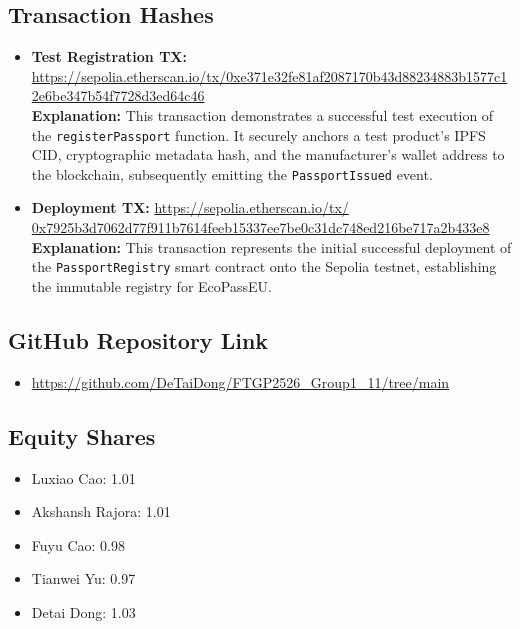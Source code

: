 \documentclass[runningheads]{llncs}
\begin{document}
	

	\subsection{Transaction Hashes}
	\begin{itemize}
		\item \textbf{Test Registration TX:} \url{https://sepolia.etherscan.io/tx/0xe371e32fe81af2087170b43d88234883b1577c12e6be347b54f7728d3ed64c46} \\
		\textbf{Explanation:} This transaction demonstrates a successful test execution of the \texttt{registerPassport} function. It securely anchors a test product's IPFS CID, cryptographic metadata hash, and the manufacturer's wallet address to the blockchain, subsequently emitting the \texttt{PassportIssued} event.
		
		\item \textbf{Deployment TX:} \url{https://sepolia.etherscan.io/tx/
			0x7925b3d7062d77f911b7614feeb15337ee7be0c31dc748ed216be717a2b433e8} \\
		\textbf{Explanation:} This transaction represents the initial successful deployment of the \texttt{PassportRegistry} smart contract onto the Sepolia testnet, establishing the immutable registry for EcoPassEU.
	\end{itemize}
	
	
	
	\subsection{GitHub Repository Link}
	\begin{itemize}
		\item \url{https://github.com/DeTaiDong/FTGP2526_Group1_11/tree/main}
	\end{itemize}
	
	\subsection{Equity Shares}
	\begin{itemize}
		\item Luxiao Cao: 1.01
		\item Akshansh Rajora: 1.01
		\item Fuyu Cao: 0.98
		\item Tianwei Yu: 0.97
		\item Detai Dong: 1.03
	\end{itemize}

	
	
\end{document}
